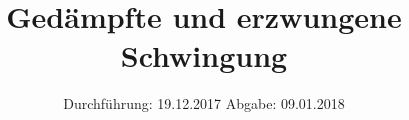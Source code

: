 

\subject{Versuch 354}
\title{Gedämpfte und erzwungene Schwingung}
\date{%
  Durchführung: 19.12.2017
  \hspace{3em}
  Abgabe: 09.01.2018
}



\maketitle
\thispagestyle{empty}
\tableofcontents
\newpage






\printbibliography{}


